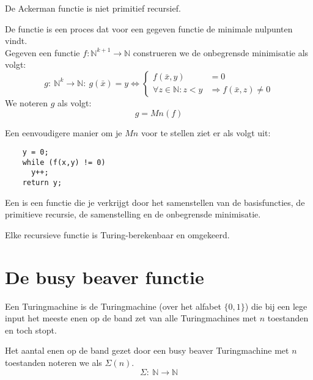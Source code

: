 \documentclass[main.tex]{subfiles}
\begin{document}
\begin{st}
  De Ackerman functie is niet primitief recursief. \zb
\end{st}

\begin{de}
  De  functie is een proces dat voor een gegeven functie de minimale nulpunten vindt.\\
  Gegeven een functie $f: \mathbb{N}^{k+1} \rightarrow \mathbb{N}$ construeren we de onbegrensde minimisatie als volgt:
  \[
  g:\ \mathbb{N}^{k} \rightarrow \mathbb{N}:\ g(\bar{x}) = y
  \Leftrightarrow
  \left\{
    \begin{array}{rl}
      f(\bar{x},y) &= 0\\
      \forall z \in \mathbb{N}: z < y &\Rightarrow  f(\bar{x},z) \neq 0
    \end{array}
  \right.
  \]
  We noteren $g$ als volgt:
  \[ g = Mn(f) \]
\end{de}

\begin{opm}
  Een eenvoudigere manier om je $Mn$ voor te stellen ziet er als volgt uit:
  \begin{verbatim}
    y = 0;
    while (f(x,y) != 0)
      y++;
    return y;
  \end{verbatim}
\end{opm}

\begin{de}
  Een  is een functie die je verkrijgt door het samenstellen van de basisfuncties, de primitieve recursie, de samenstelling en de onbegrensde minimisatie.
\end{de}

\begin{st}
  Elke recursieve functie is Turing-berekenbaar en omgekeerd. \zb
\end{st}


\section{De busy beaver functie}
\label{sec:de-busy-beaver}

\begin{de}
  Een  Turingmachine is de Turingmachine (over het alfabet $\{0,1\}$) die bij een lege input het meeste enen op de band zet van alle Turingmachines met $n$ toestanden en toch stopt.
\end{de}

\begin{de}
  Het aantal enen op de band gezet door een busy beaver Turingmachine met $n$ toestanden noteren we als $\Sigma(n)$.
  \[ \Sigma:\ \mathbb{N} \rightarrow \mathbb{N}  \]
\end{de}
\end{document}
